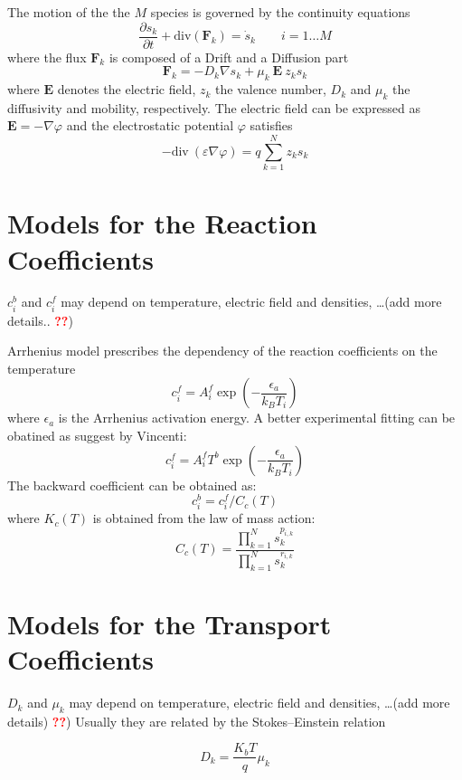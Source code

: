 \documentclass[11pt]{amsart}
\begin{document}
The motion of the the $M$ species is governed by the continuity equations
$$
\dfrac{\partial s_{k}}{\partial t} + \mathrm{div} \left( \mathbf{F}_{k} \right) = \dot{s}_k  \qquad  i=1\ldots M
$$
where the flux $\mathbf{F}_{k}$ is composed of a Drift and a Diffusion part
$$
\mathbf{F}_{k} = - D_{k} \nabla s_{k} + \mu_{k}\ \mathbf{E}\ z_{k} s_{k}
$$
where $\mathbf{E}$ denotes the electric field, $z_{k}$ the valence number, $D_{k}$ and $\mu_{k}$ 
the diffusivity and mobility, respectively.
The electric field can be expressed as $\mathbf{E} = - \nabla \varphi$ and the electrostatic potential $\varphi$ 
satisfies
$$
-\mathrm{div}\ \left( \varepsilon \nabla \varphi \right) = q \sum_{k=1}^{N} z_{k} s_{k}
$$

\section{Models for the Reaction Coefficients}

$c^{b}_i$ and $c^{f}_i$ may depend on temperature, electric field and densities, \dots(add more details.. \textcolor{red}{\textbf{??}})

Arrhenius model prescribes the dependency of the reaction coefficients on the temperature
$$
c^{f}_i = A^{f}_{i} \exp\left( -\dfrac{\epsilon_a}{k_B T_{i}} \right)
$$
where $\epsilon_a$ is the Arrhenius activation energy.
A better experimental fitting can be obatined as suggest by Vincenti:
$$
c^{f}_i =A^{f}_{i} T^b \exp\left( -\dfrac{\epsilon_a}{k_B T_{i}} \right)
$$
The backward coefficient can be obtained as:
$$
c^{b}_i= c^{f}_i/C_c(T)  
$$
where $K_c(T)$ is obtained from the law of mass action:
$$
C_c(T)= \frac{\prod_{k=1}^N s_k^{p_{i,k}}}{\prod_{k=1}^N s_k^{r_{i,k}}}
$$

\section{Models for the Transport Coefficients}

$D_{k}$ and $\mu_{k}$ may depend on temperature, electric field and densities, \dots(add more details)
\textcolor{red}{\textbf{??}})
Usually they are related by the Stokes--Einstein relation 

$$
D_{k} = \dfrac{K_{b} T}{q} \mu_{k}
$$
\end{document}
